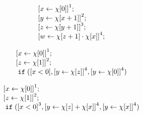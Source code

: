 \begin{example}
    \[
    \begin{array}{l}
           \clabel{ \assign{x}{\chi[0]}}^{1} ; \\
            \clabel{\assign{y}{\chi[x + 1]} }^{2} ; \\
            \clabel{\assign{z}{\chi[y + 1]}}^{3}; \\
             \clabel{\assign{w}{\chi[z + 1] \cdot \chi[x]} }^{4}  ; \\
        \end{array}
    \]
    \end{example}

    \begin{example}
        \[
        \begin{array}{l}
            \clabel{ \assign{x}{\chi[0]}}^{1} ; \\
            \clabel{\assign{z}{\chi[1]} }^{2} ; \\
            \eif(\clabel{x < 0}, \clabel{\assign{y}{\chi[z]}}^{4}, \clabel{\assign{y}{\chi[0]}}^{4})
            \end{array}
        \]
        \end{example}

        \begin{example}
            \[
            \begin{array}{l}
                \clabel{ \assign{x}{\chi[0]}}^{1} ; \\
                \clabel{\assign{z}{\chi[1]} }^{2} ; \\
                \eif(\clabel{x < 0}^{3}, \clabel{\assign{y}{\chi[z] + \chi[x]}}^{4}, \clabel{\assign{y}{\chi[x]}}^{4})
            \end{array}
            \]
            \end{example}



